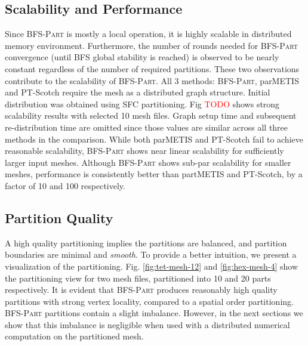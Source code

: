 \documentclass[conference]{IEEEtran}
\newcommand{\bfspart}{\textsc{BFS-Part}\xspace}
\begin{document}
\subsection{Scalability and Performance}
Since \bfspart is mostly a local operation, it is highly scalable in distributed memory environment. Furthermore, the number of rounds needed for \bfspart convergence (until BFS global stability is reached) is observed to be nearly constant regardless of the number of required partitions. These two observations contribute to the scalability of \bfspart. All 3 methods: \bfspart, parMETIS and PT-Scotch require the mesh as a distributed graph structure. Initial distribution was obtained using SFC partitioning. Fig \textcolor{red}{TODO} shows strong scalability results with selected 10 mesh files. Graph setup time and subsequent re-distribution time are omitted since those values are similar across all three methods in the comparison. While both parMETIS and PT-Scotch fail to achieve reasonable scalability, \bfspart shows near linear scalability for sufficiently larger input meshes. Although \bfspart shows sub-par scalability for smaller meshes, performance is consistently better than partMETIS and PT-Scotch, by a factor of 10 and 100 respectively.


\subsection{Partition Quality}



A high quality partitioning implies the partitions are balanced, and partition boundaries are minimal and \emph{smooth}. To provide a better intuition, we present a visualization of the partitioning. Fig. \ref{fig:tet-mesh-12} and \ref{fig:hex-mesh-4} show the partitioning view for two mesh files, partitioned into 10 and 20 parts respectively. It is evident that \bfspart produces reasonably high quality partitions with strong vertex locality, compared to a spatial order partitioning. \bfspart partitions contain a slight imbalance. However, in the next sections we show that this imbalance is negligible when used with a distributed numerical computation on the partitioned mesh.
\end{document}
